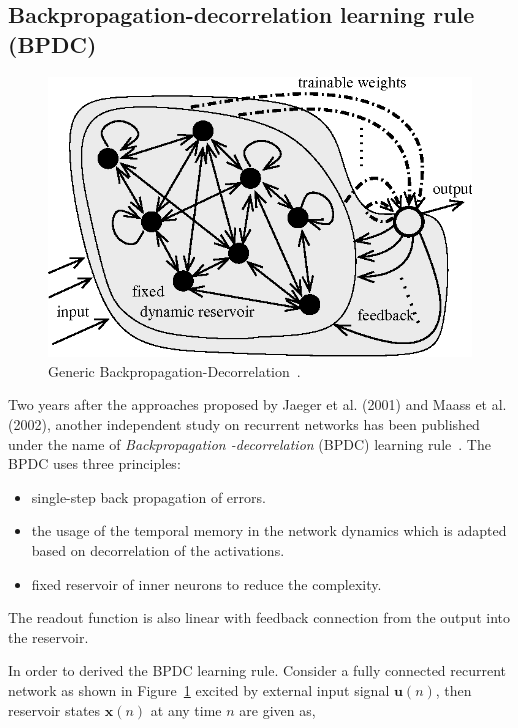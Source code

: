 \documentclass{WitsPhysicsReport}
\begin{document}
\subsection{Backpropagation-decorrelation learning rule (BPDC)}
\label{sec:Backpropagation-Decorrelation_Learning_Rule}




\begin{figure}
\centering
  \includegraphics[width=0.8\linewidth]{./Figure/backpropagation_decorrelation.png}
 \caption{Generic Backpropagation-Decorrelation~\cite{steil2006online}. }
 \label{fig:BPDC}
\end{figure}

Two years after the approaches proposed by Jaeger et al. (2001) and Maass et al. (2002), another independent study on recurrent networks has been published under the name of \textit{Backpropagation
-decorrelation} (BPDC) learning rule~\cite{steil2006online}. The BPDC  uses three principles:

\begin{itemize}
    \item single-step back propagation of errors.
    \item the usage of the temporal memory in the network dynamics which is adapted based on decorrelation of the activations.
    \item fixed reservoir of inner neurons to reduce the complexity.
\end{itemize}


The readout function is also linear with feedback connection from the output into the reservoir.


In order to derived the BPDC learning rule. Consider a fully connected recurrent network as shown in Figure~\ref{fig:BPDC} excited by external input signal $\mathbf{u}(n)$, then reservoir states $\mathbf{x}(n)$ at any time $n$ are given as,
\end{document}
